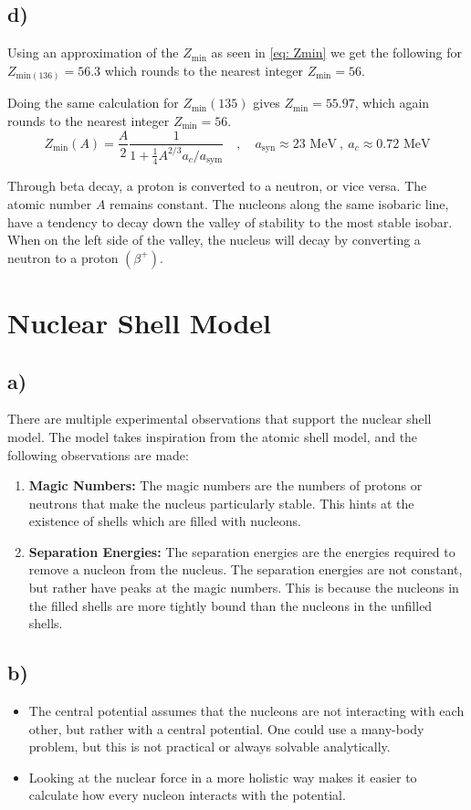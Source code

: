 \documentclass{article}
\begin{document}
\subsection*{d)}
Using an approximation of the $Z_{\text{min}}$ as seen in \cref{eq: Zmin} we get the following for $Z_{\text{min}(136)} = 56.3$ which rounds to the nearest integer $Z_{\text{min}} = 56$. 

Doing the same calculation for $Z_{\text{min}}(135)$ gives $Z_{\text{min}} = 55.97$, which again rounds to the nearest integer $Z_{\text{min}} = 56$. 
\begin{equation}\label{eq: Zmin}
Z_{\text{min}}(A) = \frac{A}{2} \frac{1}{1 + \frac{1}{4}A^{2 / 3}a_c / a_{\text{sym}}} \quad , \quad  a_{\text{syn}} ≈ 23 \text{ MeV} \ , \ a_c ≈ 0.72 \text{ MeV}
\end{equation}

Through beta decay, a proton is converted to a neutron, or vice versa. The atomic number $A$ remains constant. The nucleons along the same isobaric line, have a tendency to decay down the valley of stability to the most stable isobar. When on the left side of the valley, the nucleus will decay by converting a neutron to a proton $(β^{+})$. 


\section{Nuclear Shell Model}
\subsection*{a)}
There are multiple experimental observations that support the nuclear shell model. The model takes inspiration from the atomic shell model, and the following observations are made:
\begin{enumerate}
    \item \textbf{Magic Numbers:} The magic numbers are the numbers of protons or neutrons that make the nucleus particularly stable. This hints at the existence of shells which are filled with nucleons.
    \item \textbf{Separation Energies:} The separation energies are the energies required to remove a nucleon from the nucleus. The separation energies are not constant, but rather have peaks at the magic numbers. This is because the nucleons in the filled shells are more tightly bound than the nucleons in the unfilled shells.
\end{enumerate}

\subsection*{b)}
\begin{itemize}
    \item The central potential assumes that the nucleons are not interacting with each other, but rather with a central potential. One could use a many-body problem, but this is not practical or always solvable analytically. 
    \item Looking at the nuclear force in a more holistic way makes it easier to calculate how every nucleon interacts with the potential.
\end{itemize}
\end{document}
